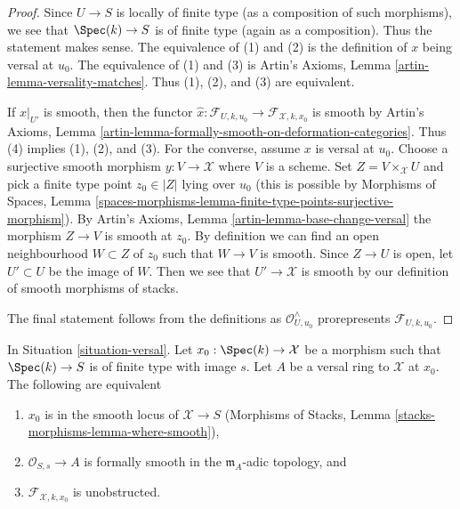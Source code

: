 \begin{proof}
Since $U \to S$ is locally of finite type (as a composition of such morphisms),
we see that $\Spec(k) \to S$ is of finite type (again as a composition).
Thus the statement makes sense. The equivalence of (1) and (2)
is the definition of $x$ being versal at $u_0$.
The equivalence of (1) and (3) is
Artin's Axioms, Lemma \ref{artin-lemma-versality-matches}.
Thus (1), (2), and (3) are equivalent.

\medskip\noindent
If $x|_{U'}$ is smooth, then the functor
$\hat x : \mathcal{F}_{U, k, u_0} \to \mathcal{F}_{\mathcal{X}, k, x_0}$
is smooth by Artin's Axioms, Lemma
\ref{artin-lemma-formally-smooth-on-deformation-categories}.
Thus (4) implies (1), (2), and (3).
For the converse, assume $x$ is versal at $u_0$.
Choose a surjective smooth morphism $y : V \to \mathcal{X}$ where $V$
is a scheme. Set $Z = V \times_\mathcal{X} U$ and pick a finite type
point $z_0 \in |Z|$ lying over $u_0$ (this is possible by
Morphisms of Spaces, Lemma
\ref{spaces-morphisms-lemma-finite-type-points-surjective-morphism}).
By Artin's Axioms, Lemma \ref{artin-lemma-base-change-versal}
the morphism $Z \to V$ is smooth at $z_0$.
By definition we can find an open neighbourhood $W \subset Z$
of $z_0$ such that $W \to V$ is smooth. Since $Z \to U$ is open,
let $U' \subset U$ be the image of $W$. Then we see that
$U' \to \mathcal{X}$ is smooth by our definition of smooth morphisms
of stacks.

\medskip\noindent
The final statement follows from the definitions as
$\mathcal{O}_{U, u_0}^\wedge$
prorepresents $\mathcal{F}_{U, k, u_0}$.
\end{proof}

\begin{lemma}
\label{lemma-characterize-smoothness}
In Situation \ref{situation-versal}. Let $x_0 : \Spec(k) \to \mathcal{X}$
be a morphism such that $\Spec(k) \to S$ is of finite type with image $s$.
Let $A$ be a versal ring to $\mathcal{X}$ at $x_0$. The following
are equivalent
\begin{enumerate}
\item $x_0$ is in the smooth locus of $\mathcal{X} \to S$
(Morphisms of Stacks, Lemma \ref{stacks-morphisms-lemma-where-smooth}),
\item $\mathcal{O}_{S, s} \to A$ is formally smooth in the
$\mathfrak m_A$-adic topology, and
\item $\mathcal{F}_{\mathcal{X}, k, x_0}$ is unobstructed.
\end{enumerate}
\end{lemma}

